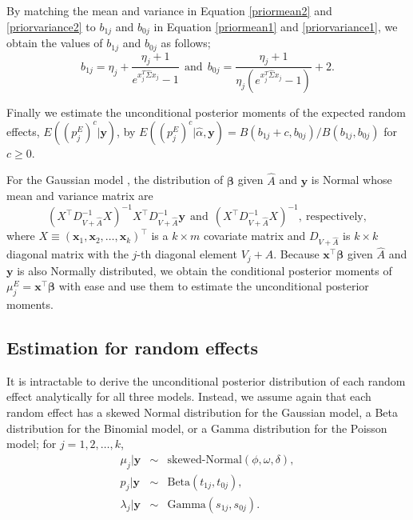 \documentclass[article]{jss}
\begin{document}
By matching the  mean and variance in Equation \ref{priormean2} and \ref{priorvariance2} to $b_{1j}$ and $b_{0j}$ in Equation \ref{priormean1} and \ref{priorvariance1}, we obtain the values of $b_{1j}$ and $b_{0j}$ as follows;
\begin{equation}\label{priormeanpara}
b_{1j}=\eta_j+\frac{\eta_j + 1}{e^{x_j^{T}\hat{\Sigma} x_j}-1}~~\textrm{and}~~b_{0j}=\frac{\eta_j + 1}{\eta_j(e^{x_j^{T}\hat{\Sigma} x_j}-1)}+2.
\end{equation}

Finally we estimate the unconditional posterior moments of the expected random effects, $E((p^E_{j})^c\vert\boldsymbol{y})$, by $E((p^E_{j})^c\vert\hat{\alpha}, \boldsymbol{y})=B(b_{1j} + c, b_{0j})/B(b_{1j}, b_{0j})$ for $c\ge0$.


For the Gaussian model \citep{tang2011}, the distribution of $\boldsymbol{\beta}$ given $\hat{A}$ and $\boldsymbol{y}$ is Normal whose mean and variance matrix are
\begin{equation}
(X^\top D^{-1}_{V+\hat{A}} X)^{-1}X^\top D^{-1}_{V+\hat{A}}\boldsymbol{y}~~ \textrm{and}~~ (X^\top D^{-1}_{V+\hat{A}} X)^{-1}, ~\textrm{respectively},
\end{equation}
where $X\equiv (\boldsymbol{x}_1, \boldsymbol{x}_2, \ldots, \boldsymbol{x}_k)^\top$ is a $k \times m$ covariate matrix and $D_{V+\hat{A}}$ is $k \times k$ diagonal matrix with the $j$-th diagonal element $V_j+\hat{A}$. Because $\boldsymbol{x}^\top\boldsymbol{\beta}$ given $\hat{A}$ and $\boldsymbol{y}$ is also Normally distributed, we obtain the conditional posterior moments of $\mu^E_j=\boldsymbol{x}^\top\boldsymbol{\beta}$ with ease and use them to estimate the unconditional posterior moments.


\subsection{Estimation for random effects}
It is intractable to derive the unconditional posterior distribution of each random effect analytically for all three models. Instead, we  assume again that each random effect has a skewed Normal distribution \cite{azzalini1985class} for the Gaussian model, a Beta distribution for the Binomial model, or a Gamma distribution for the Poisson model; for $j=1, 2, \ldots, k$,
\begin{eqnarray}
\mu_j\vert\boldsymbol{y} &\sim& \textrm{skewed-Normal}(\phi, \omega, \delta),\label{skewnormal}\\
p_j\vert \boldsymbol{y} &\sim& \textrm{Beta}(t_{1j}, t_{0j}),\label{betapost}\\
\lambda_j\vert \boldsymbol{y} &\sim& \textrm{Gamma}(s_{1j}, s_{0j}).\label{gammapost}
\end{eqnarray}
\end{document}
